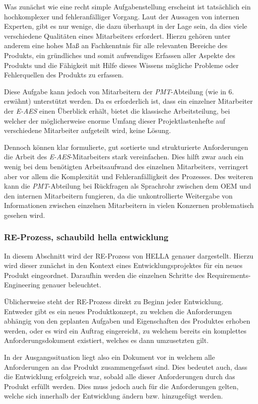 \documentclass[12pt]{report}
\begin{document}
Was zunächst wie eine recht simple Aufgabenstellung erscheint ist tatsächlich ein hochkomplexer und fehleranfälliger Vorgang. Laut der Aussagen von internen Experten, gibt es nur wenige, die dazu überhaupt in der Lage sein, da dies viele verschiedene Qualitäten eines Mitarbeiters erfordert. Hierzu gehören unter anderem eine hohes Maß an Fachkenntnis für alle relevanten Bereiche des Produkts, ein gründliches und somit aufwendiges Erfassen aller Aspekte des Produkts und die Fähigkeit mit Hilfe dieses Wissens mögliche Probleme oder Fehlerquellen des Produkts zu erfassen. 

Diese Aufgabe kann jedoch von Mitarbeitern der \textit{PMT}-Abteilung (wie in 6. erwähnt) unterstützt werden. Da es erforderlich ist, dass ein einzelner Mitarbeiter der \textit{E-AES} einen Überblick erhält, bietet die klassische Arbeitsteilung, bei welcher der möglicherweise enorme Umfang dieser Projektlastenhefte auf verschiedene Mitarbeiter aufgeteilt wird, keine Lösung.

Dennoch können klar formulierte, gut sortierte und strukturierte Anforderungen die Arbeit des \textit{E-AES}-Mitarbeiters stark vereinfachen. Dies hilft zwar auch ein wenig bei dem benötigten Arbeitsaufwand des einzelnen Mitarbeiters, verringert aber vor allem die Komplexität und Fehleranfälligkeit des Prozesses. Des weiteren kann die \textit{PMT}-Abteilung bei Rückfragen als Sprachrohr zwischen dem OEM und den internen Mitarbeitern fungieren, da die unkontrollierte Weitergabe von Informationen zwischen einzelnen Mitarbeitern in vielen Konzernen problematisch gesehen wird. 
\subsubsection{RE-Prozess, schaubild hella entwicklung}
In diesem Abschnitt wird der RE-Prozess von HELLA genauer dargestellt. Hierzu wird dieser zunächst in den Kontext eines Entwicklungsprojektes für ein neues Produkt eingeordnet. Daraufhin werden die einzelnen Schritte des Requirements-Engineering genauer beleuchtet. 

Üblicherweise steht der RE-Prozess direkt zu Beginn jeder Entwicklung. Entweder gibt es ein neues Produktkonzept, zu welchen die Anforderungen abhängig von den geplanten Aufgaben und Eigenschaften des Produktes erhoben werden, oder es wird ein Auftrag eingereicht, zu welchem bereits ein komplettes Anforderungsdokument existiert, welches es dann umzusetzten gilt.

In der Ausgangssituation liegt also ein Dokument vor in welchem alle Anforderungen an das Produkt zusammengefasst sind. Dies bedeutet auch, dass die Entwicklung erfolgreich war, sobald alle dieser Anforderungen durch das Produkt erfüllt werden. Dies muss jedoch auch für die Anforderungen gelten, welche sich innerhalb der Entwicklung ändern bzw. hinzugefügt werden.
\end{document}

